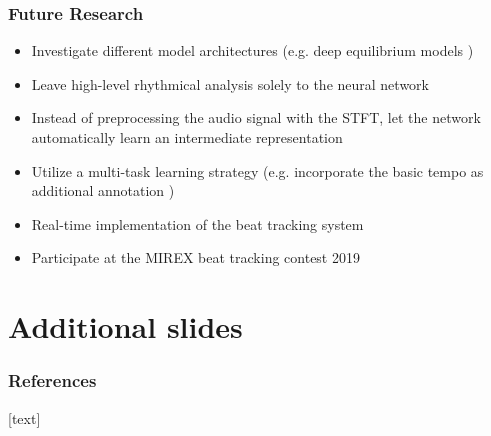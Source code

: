 \documentclass{beamer}
\begin{document}
\begin{frame}
\frametitle{Future Research}
\begin{itemize}
\item Investigate different model architectures (e.g. deep equilibrium models \cite{Bai2019b})
\item Leave high-level rhythmical analysis solely to the neural network 
\item Instead of preprocessing the audio signal with the STFT, let the network automatically learn an intermediate representation
\item Utilize a multi-task learning strategy (e.g. incorporate the basic tempo as additional annotation \cite{Boeck2019})
\item Real-time implementation of the beat tracking system
\item Participate at the MIREX beat tracking contest 2019
\end{itemize}
\end{frame}










\section*{Additional slides}


\begin{frame} %
\frametitle{References}

[text]
% 

\tiny


\end{frame}
\end{document}
